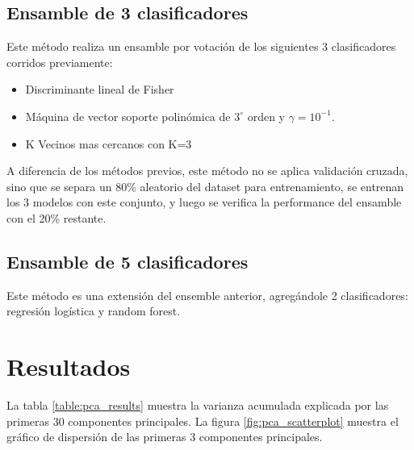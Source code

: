\documentclass[journal]{IEEEtran}
\begin{document}
\subsection{Ensamble de 3 clasificadores}
Este método realiza un ensamble por votación de los siguientes 3
clasificadores corridos previamente:

\begin{itemize}
\item Discriminante lineal de Fisher
\item Máquina de vector soporte polinómica de $3^{\circ}$ orden y $\gamma=10^{-1}$. 
\item K Vecinos mas cercanos con K=3
\end{itemize}

A diferencia de los métodos previos, este método no se aplica
validación cruzada, sino que se separa un 80\% aleatorio del dataset para 
entrenamiento, se entrenan los 3 modelos con este conjunto, y luego
se verifica la performance del ensamble con el 20\% restante.

\subsection{Ensamble de 5 clasificadores}
Este método es una extensión del ensemble anterior, agregándole
2 clasificadores: regresión logística y random forest.

\section{Resultados}

La tabla \ref{table:pca_results} muestra la varianza acumulada explicada 
por las primeras 30 componentes principales. La figura \ref{fig:pca_scatterplot}
muestra el gráfico de dispersión de las primeras 3 componentes principales.
\end{document}
